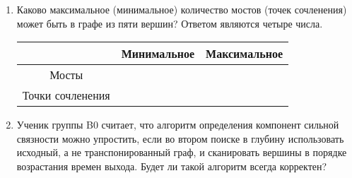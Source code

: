 \documentclass[a4paper,10pt]{article}
\begin{document}
\begin{enumerate}
      \vskip 4cm

     \item
       Каково максимальное (минимальное) количество мостов (точек сочленения)
       может быть в графе из пяти вершин? Ответом являются четыре числа.
      
      \begin{center}
        \begin{tabular}{|c|c|c|}
          \hline
           & Минимальное & Максимальное \\
          \hline
          Мосты & & \\
          \hline
          Точки сочленения & & \\
          \hline
        \end{tabular}
      \end{center}

     \item
       Ученик группы B0 считает, что алгоритм определения компонент сильной связности
       можно упростить, если во втором поиске в глубину использовать исходный,
       а не транспонированный граф, и сканировать вершины в порядке возрастания времен
       выхода. Будет ли такой алгоритм всегда корректен?

  \end{enumerate}
\end{document}

